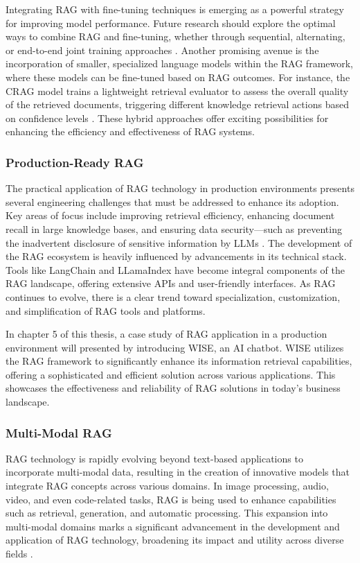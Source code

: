 Integrating RAG with fine-tuning techniques is emerging as a powerful strategy for improving model performance. Future research should explore the optimal ways to combine RAG and fine-tuning, whether through sequential, alternating, or end-to-end joint training approaches \cite{lin2023ra}. Another promising avenue is the incorporation of smaller, specialized language models within the RAG framework, where these models can be fine-tuned based on RAG outcomes. For instance, the CRAG model trains a lightweight retrieval evaluator to assess the overall quality of the retrieved documents, triggering different knowledge retrieval actions based on confidence levels \cite{yan2024corrective}. These hybrid approaches offer exciting possibilities for enhancing the efficiency and effectiveness of RAG systems.

\subsubsection{Production-Ready RAG}

The practical application of RAG technology in production environments presents several engineering challenges that must be addressed to enhance its adoption. Key areas of focus include improving retrieval efficiency, enhancing document recall in large knowledge bases, and ensuring data security—such as preventing the inadvertent disclosure of sensitive information by LLMs \cite{alon2022neuro}. The development of the RAG ecosystem is heavily influenced by advancements in its technical stack. Tools like LangChain and LLamaIndex have become integral components of the RAG landscape, offering extensive APIs and user-friendly interfaces. As RAG continues to evolve, there is a clear trend toward specialization, customization, and simplification of RAG tools and platforms.

In chapter 5 of this thesis, a case study of RAG application in a production environment will presented by introducing WISE, an AI chatbot. WISE utilizes the RAG framework to significantly enhance its information retrieval capabilities, offering a sophisticated and efficient solution across various applications. This showcases the effectiveness and reliability of RAG solutions in today’s business landscape.

\subsubsection{Multi-Modal RAG}

RAG technology is rapidly evolving beyond text-based applications to incorporate multi-modal data, resulting in the creation of innovative models that integrate RAG concepts across various domains. In image processing, audio, video, and even code-related tasks, RAG is being used to enhance capabilities such as retrieval, generation, and automatic processing. This expansion into multi-modal domains marks a significant advancement in the development and application of RAG technology, broadening its impact and utility across diverse fields \cite{gao2023retrieval}.

